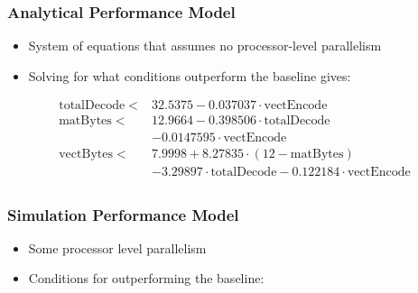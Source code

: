 \documentclass{beamer}
\begin{document}

\begin{frame}
	\frametitle{Analytical Performance Model}
	\begin{itemize}
		\item System of equations that assumes no processor-level parallelism
		\item Solving for what conditions outperform the baseline gives:
	\end{itemize}
	\begin{align*}
		\mathrm{totalDecode} <& 32.5375 - 0.037037\cdot\mathrm{vectEncode} \\
		\mathrm{matBytes} <& 12.9664 - 0.398506\cdot\mathrm{totalDecode} \\
							&- 0.0147595\cdot\mathrm{vectEncode}\\
		\mathrm{vectBytes} <& 7.9998 + 8.27835\cdot(12 - \mathrm{matBytes}) \\
							&- 3.29897\cdot\mathrm{totalDecode}- 0.122184\cdot\mathrm{vectEncode}\\
	\end{align*}
\end{frame}

\begin{frame}
	\frametitle{Simulation Performance Model}
	\begin{itemize}
		\item Some processor level parallelism
		\item Conditions for outperforming the baseline:
	\end{itemize}
	
	
\end{frame}



\end{document}
